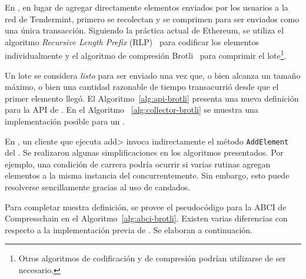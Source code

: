 %

En \compresschain, en lugar de agregar directamente elementos enviados por los usuarios a la red de Tendermint,
primero se recolectan y se comprimen para ser enviados como una única transacción.
Siguiendo la práctica actual de Ethereum, se utiliza el algoritmo
\textit{Recursive Length Prefix} (RLP)~\cite{wood2014ethereum} para codificar los elementos individualmente
y el algoritmo de compresión Brotli~\cite{brotli.compressor} para comprimir el lote\footnote{Otros
algoritmos de codificación y de compresión podrían utilizarse de ser necesario.}.

%
Un lote se considera \textit{listo} para ser enviado una vez que, o bien alcanza un tamaño máximo,
o bien una cantidad razonable de tiempo transacurrió desde que el primer elemento llegó. 
%
El Algoritmo~\ref{alg:api-brotli} presenta una nueva definición para la API de \setchain.
En el Algoritmo ~\ref{alg:collector-brotli} se muestra una implementación posible para un
\collector.





%
En \compresschain, un cliente que ejecuta \<add> invoca indirectamente el método \texttt{AddElement}
del \collector.
%
Se realizaron algunas simplificaciones en los algoritmos presentados. Por ejemplo, una condición de carrera
podría ocurrir si varias rutinas agregan elementos a la misma instancia del \collector concurrentemente.
Sin embargo, esto puede resolverse sencillamente gracias al uso de candados.



%
Para completar nuestra definición, se provee el pseudocódigo para la ABCI de Compresschain en el
Algoritmo~\ref{alg:abci-brotli}.
%
Existen varias diferencias con respecto a la implementación previa de \setchain. Se elaboran
a continuación.
%


